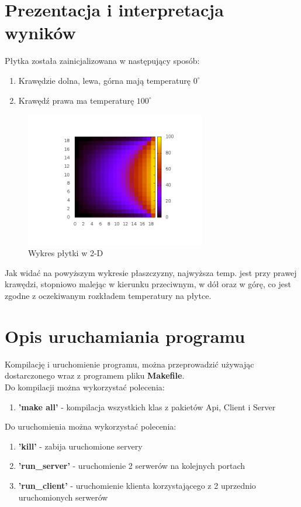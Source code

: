 \documentclass[11pt,a4paper]{article}
\begin{document}
\section{Prezentacja i interpretacja wyników}

Płytka została zainicjalizowana w następujący sposób:
\begin{enumerate}
	\item Krawędzie dolna, lewa, górna mają temperaturę $0^{\circ}$
	\item Krawędź prawa ma temperaturę $100^{\circ}$
\end{enumerate}

\begin{figure}[H]
\begin{center}
\includegraphics[width=0.7\textwidth]{grid.png}
\caption{Wykres płytki w 2-D}
\end{center}
\end{figure}

Jak widać na powyższym wykresie płaszczyzny, najwyższa temp. jest przy prawej krawędzi, stopniowo malejąc w kierunku przeciwnym, w dół oraz w górę, co jest zgodne z oczekiwanym rozkładem temperatury na płytce.

\section{Opis uruchamiania programu}

Kompilację i uruchomienie programu, można przeprowadzić używając dostarczonego wraz z programem pliku \textbf{Makefile}.\\
Do kompilacji można wykorzystać polecenia:
\begin{enumerate}
	\item \textbf{'make all'} - kompilacja wszystkich klas z pakietów Api, Client i Server
\end{enumerate}
Do uruchomienia można wykorzystać polecenia:
\begin{enumerate}
	\item \textbf{'kill'} - zabija uruchomione servery
	\item \textbf{'run\_server'} - uruchomienie 2 serwerów na kolejnych portach
	\item \textbf{'run\_client'} - uruchomienie klienta korzystającego z 2 uprzednio uruchomionych serwerów
\end{enumerate}
\end{document}
